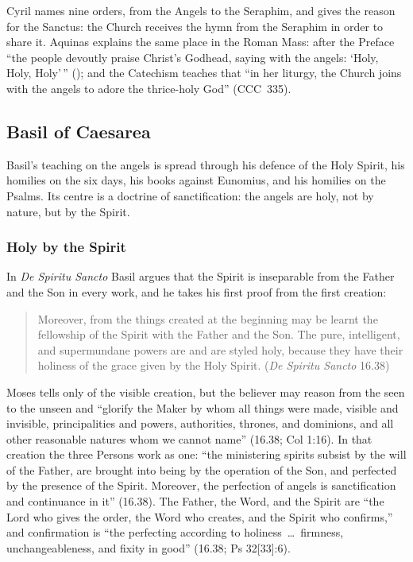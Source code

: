 \noindent Cyril names nine orders, from the Angels to the Seraphim, and
gives the reason for the Sanctus: the Church receives the hymn from the
Seraphim in order to share it. Aquinas explains the same place in the
Roman Mass: after the Preface ``the people devoutly praise Christ's
Godhead, saying with the angels: `Holy, Holy, Holy'\,'' (); and the Catechism teaches that ``in her liturgy, the Church joins
with the angels to adore the thrice-holy God'' (CCC~335).

\sectionguard
\subsection{Basil of Caesarea}\label{sec:fb-basil}

Basil's teaching on the angels is spread through his defence of the
Holy Spirit, his homilies on the six days, his books against Eunomius,
and his homilies on the Psalms. Its centre is a doctrine of sanctification:
the angels are holy, not by nature, but by the Spirit.

\subsubsection{Holy by the Spirit}

In \emph{De Spiritu Sancto} Basil argues that the Spirit is inseparable
from the Father and the Son in every work, and he takes his first proof
from the first creation:

\begin{quote}
Moreover, from the things created at the beginning may be learnt the
fellowship of the Spirit with the Father and the Son. The pure,
intelligent, and supermundane powers are and are styled holy, because
they have their holiness of the grace given by the Holy Spirit.
(\emph{De Spiritu Sancto} 16.38)
\end{quote}

\noindent Moses tells only of the visible creation, but the believer may
reason from the seen to the unseen and ``glorify the Maker by whom all
things were made, visible and invisible, principalities and powers,
authorities, thrones, and dominions, and all other reasonable natures
whom we cannot name'' (16.38; Col 1:16). In that creation the three
Persons work as one: ``the ministering spirits subsist by the will of
the Father, are brought into being by the operation of the Son, and
perfected by the presence of the Spirit. Moreover, the perfection of
angels is sanctification and continuance in it'' (16.38). The Father,
the Word, and the Spirit are ``the Lord who gives the order, the Word who
creates, and the Spirit who confirms,'' and confirmation is ``the
perfecting according to holiness~\dots\ firmness, unchangeableness, and
fixity in good'' (16.38; Ps 32[33]:6).

